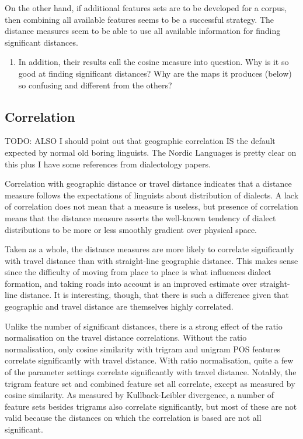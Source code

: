 On the other hand, if additional features sets are to be developed for
a corpus, then combining all available features seems to be a
successful strategy. The distance measures seem to be able to use all
available information for finding significant distances.

\begin{enumerate}
\item In addition, their results call the cosine measure into question. Why is it so
  good at finding significant distances? Why are the maps it produces (below) so
  confusing and different from the others?
\end{enumerate}
\subsection{Correlation}
TODO: ALSO I should point out that geographic correlation IS the
default expected by normal old boring linguists. The Nordic Languages
is pretty clear on this plus I have some references from
dialectology papers.

Correlation with geographic distance or travel distance indicates that
a distance measure follows the expectations of linguists about
distribution of dialects. A lack of correlation does not mean that a
measure is useless, but presence of correlation means that the
distance measure asserts the well-known tendency of dialect
distributions to be more or less smoothly gradient over physical
space.

Taken as a whole, the distance measures are more likely to correlate
significantly with travel distance than with straight-line geographic
distance. This makes sense since the difficulty of moving from place
to place is what influences dialect formation, and taking roads into
account is an improved estimate over straight-line distance. It is
interesting, though, that there is such a difference given that geographic
and travel distance are themselves highly correlated.

Unlike the number of significant distances, there is a strong effect
of the ratio normalisation on the travel distance
correlations. Without the ratio normalisation, only cosine similarity
with trigram and unigram POS features correlate significantly with
travel distance. With ratio normalisation, quite a few of the
parameter settings correlate significantly with travel
distance. Notably, the trigram feature set and combined feature set
all correlate, except as measured by cosine similarity. As measured by
Kullback-Leibler divergence, a number of feature sets besides trigrams
also correlate significantly, but most of these are not valid because
the distances on which the correlation is based are not all significant.

